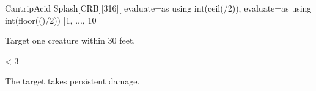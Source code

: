 
\begin{card-collection}{Cantrip}{\level}{Acid Splash}[CRB][316]{\level}[
  evaluate=\level as \half using int(ceil(\level/2)),
  evaluate=\level as \dice using int(floor(()/2))
]{1, ..., 10}




Target one creature within 30 feet.

\ifnum \level < 3
\else
{}
\fi

 The target takes  \half{} persistent damage.
\end{card-collection}%


